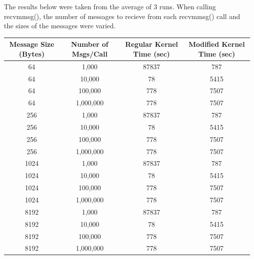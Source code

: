 \documentclass[11pt]{article}
\begin{document}

The results below were taken from the average of 3 runs. When calling recvmmsg(), the number of messages to recieve from each recvmmsg() call and 
the sizes of the messages were varied. 

\pagebreak

\begin{center}
    \begin{tabular}{||c c c c||} 
     \hline
     Message Size (Bytes) & Number of Msgs/Call & Regular Kernel Time (sec) & Modified Kernel Time (sec) \\ [0.5ex] 
     \hline\hline
     64  & 1,000 & 87837 & 787 \\ 
     \hline
     64  & 10,000 & 78 & 5415 \\
     \hline
     64  & 100,000 & 778 & 7507 \\
     \hline
     64  & 1,000,000 & 778 & 7507 \\
     \hline\hline
     256  & 1,000 & 87837 & 787 \\ 
     \hline
     256  & 10,000 & 78 & 5415 \\
     \hline
     256  & 100,000 & 778 & 7507 \\
     \hline
     256  & 1,000,000 & 778 & 7507 \\
     \hline\hline
     1024  & 1,000 & 87837 & 787 \\ 
     \hline
     1024  & 10,000 & 78 & 5415 \\
     \hline
     1024  & 100,000 & 778 & 7507 \\
     \hline
     1024  & 1,000,000 & 778 & 7507 \\
     \hline\hline
     8192  & 1,000 & 87837 & 787 \\ 
     \hline
     8192  & 10,000 & 78 & 5415 \\
     \hline
     8192  & 100,000 & 778 & 7507 \\
     \hline
     8192  & 1,000,000 & 778 & 7507 \\
     \hline
    \end{tabular}
\end{center}
\end{document}

